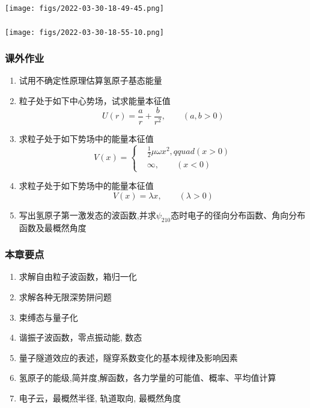 \begin{frame}
	\frametitle{}
  \begin{center}
	   \texttt{[image: figs/2022-03-30-18-49-45.png]}
  \end{center}
\end{frame}

\begin{frame}
	\frametitle{}
  \begin{center}
	   \texttt{[image: figs/2022-03-30-18-55-10.png]}
  \end{center}
\end{frame}


\begin{frame}[label=current]
  \frametitle{课外作业}
  \begin{enumerate}
    \item 试用不确定性原理估算氢原子基态能量
    \item 粒子处于如下中心势场，试求能量本征值
    \[U(r)= \frac{a}{r} + \frac{b}{r^2}, \qquad (a,b>0) \]
    \item 求粒子处于如下势场中的能量本征值
        \[ V(x) = \left\{ \begin{aligned}
			&\frac{1}{2}\mu \omega x^2, qquad (x>0) \\ 
			& \infty, \qquad (x<0)
		\end{aligned}\right.\] 
	\item 求粒子处于如下势场中的能量本征值
        \[ V(x) = \lambda x, \qquad (\lambda>0)\] 
    \item 写出氢原子第一激发态的波函数,并求$\psi _{210}$态时电子的径向分布函数、角向分布函数及最概然角度
  \end{enumerate}
\end{frame} 



\begin{frame}[label=current]
  \frametitle{本章要点}
  \begin{enumerate}
    \item 求解自由粒子波函数，箱归一化
    \item 求解各种无限深势阱问题
    \item 束缚态与量子化
    \item 谐振子波函数，零点振动能, 数态
    \item 量子隧道效应的表述，隧穿系数变化的基本规律及影响因素
    \item 氢原子的能级,简并度,解函数，各力学量的可能值、概率、平均值计算
    \item 电子云，最概然半径, 轨道取向, 最概然角度
  \end{enumerate}

\end{frame} 